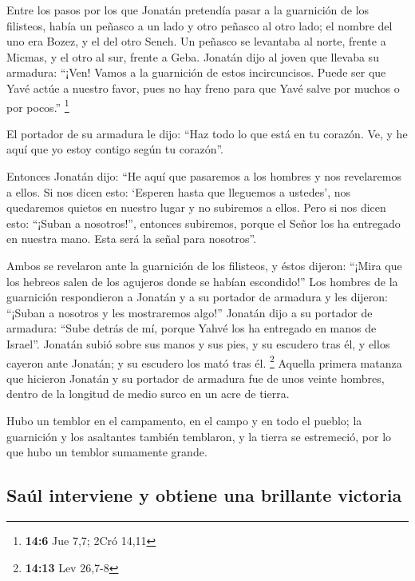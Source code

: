 \begin{paracol}{2}
 Entre los pasos por los que Jonatán pretendía pasar a la
guarnición de los filisteos, había un peñasco a un lado y otro peñasco
al otro lado; el nombre del uno era Bozez, y el del otro Seneh.
 Un peñasco se levantaba al norte, frente a Micmas, y el
otro al sur, frente a Geba.  Jonatán dijo al joven que
llevaba su armadura: ``¡Ven! Vamos a la guarnición de estos
incircuncisos. Puede ser que Yavé actúe a nuestro favor, pues no hay
freno para que Yavé salve por muchos o por pocos.'' \footnote{\textbf{14:6}
  Jue 7,7; 2Cró 14,11}

 El portador de su armadura le dijo: ``Haz todo lo que
está en tu corazón. Ve, y he aquí que yo estoy contigo según tu
corazón''.

 Entonces Jonatán dijo: ``He aquí que pasaremos a los
hombres y nos revelaremos a ellos.  Si nos dicen esto:
`Esperen hasta que lleguemos a ustedes', nos quedaremos quietos en
nuestro lugar y no subiremos a ellos.  Pero si nos dicen
esto: ``¡Suban a nosotros!'', entonces subiremos, porque el Señor los ha
entregado en nuestra mano. Esta será la señal para nosotros''.

 Ambos se revelaron ante la guarnición de los filisteos,
y éstos dijeron: ``¡Mira que los hebreos salen de los agujeros donde se
habían escondido!''  Los hombres de la guarnición
respondieron a Jonatán y a su portador de armadura y les dijeron:
``¡Suban a nosotros y les mostraremos algo!'' Jonatán dijo a su portador
de armadura: ``Sube detrás de mí, porque Yahvé los ha entregado en manos
de Israel''.  Jonatán subió sobre sus manos y sus pies, y
su escudero tras él, y ellos cayeron ante Jonatán; y su escudero los
mató tras él. \footnote{\textbf{14:13} Lev 26,7-8} 
Aquella primera matanza que hicieron Jonatán y su portador de armadura
fue de unos veinte hombres, dentro de la longitud de medio surco en un
acre de tierra.

 Hubo un temblor en el campamento, en el campo y en todo
el pueblo; la guarnición y los asaltantes también temblaron, y la tierra
se estremeció, por lo que hubo un temblor sumamente grande.

\hypertarget{sauxfal-interviene-y-obtiene-una-brillante-victoria}{%
\subsection{Saúl interviene y obtiene una brillante
victoria}\label{sauxfal-interviene-y-obtiene-una-brillante-victoria}}


\end{paracol}
